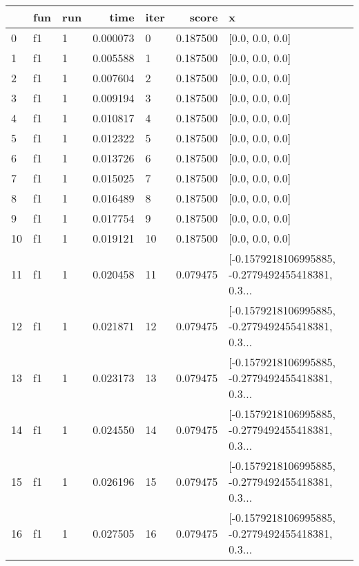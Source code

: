 \begin{tabular}{lllrlrl}
\toprule
{} & fun & run &      time & iter &     score &                                                  x \\
\midrule
0   &  f1 &   1 &  0.000073 &    0 &  0.187500 &                                    [0.0, 0.0, 0.0] \\
1   &  f1 &   1 &  0.005588 &    1 &  0.187500 &                                    [0.0, 0.0, 0.0] \\
2   &  f1 &   1 &  0.007604 &    2 &  0.187500 &                                    [0.0, 0.0, 0.0] \\
3   &  f1 &   1 &  0.009194 &    3 &  0.187500 &                                    [0.0, 0.0, 0.0] \\
4   &  f1 &   1 &  0.010817 &    4 &  0.187500 &                                    [0.0, 0.0, 0.0] \\
5   &  f1 &   1 &  0.012322 &    5 &  0.187500 &                                    [0.0, 0.0, 0.0] \\
6   &  f1 &   1 &  0.013726 &    6 &  0.187500 &                                    [0.0, 0.0, 0.0] \\
7   &  f1 &   1 &  0.015025 &    7 &  0.187500 &                                    [0.0, 0.0, 0.0] \\
8   &  f1 &   1 &  0.016489 &    8 &  0.187500 &                                    [0.0, 0.0, 0.0] \\
9   &  f1 &   1 &  0.017754 &    9 &  0.187500 &                                    [0.0, 0.0, 0.0] \\
10  &  f1 &   1 &  0.019121 &   10 &  0.187500 &                                    [0.0, 0.0, 0.0] \\
11  &  f1 &   1 &  0.020458 &   11 &  0.079475 &  [-0.1579218106995885, -0.2779492455418381, 0.3... \\
12  &  f1 &   1 &  0.021871 &   12 &  0.079475 &  [-0.1579218106995885, -0.2779492455418381, 0.3... \\
13  &  f1 &   1 &  0.023173 &   13 &  0.079475 &  [-0.1579218106995885, -0.2779492455418381, 0.3... \\
14  &  f1 &   1 &  0.024550 &   14 &  0.079475 &  [-0.1579218106995885, -0.2779492455418381, 0.3... \\
15  &  f1 &   1 &  0.026196 &   15 &  0.079475 &  [-0.1579218106995885, -0.2779492455418381, 0.3... \\
16  &  f1 &   1 &  0.027505 &   16 &  0.079475 &  [-0.1579218106995885, -0.2779492455418381, 0.3... \\

\end{tabular}
